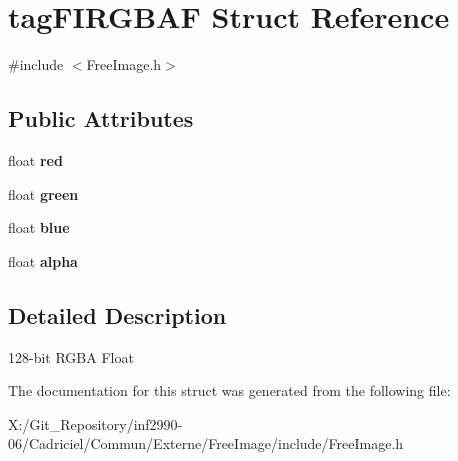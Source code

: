 \hypertarget{structtag_f_i_r_g_b_a_f}{\section{tag\-F\-I\-R\-G\-B\-A\-F Struct Reference}
\label{structtag_f_i_r_g_b_a_f}
}


{\ttfamily \#include $<$Free\-Image.\-h$>$}

\subsection*{Public Attributes}
\begin{DoxyCompactItemize}
\item 
\hypertarget{structtag_f_i_r_g_b_a_f_a59e5260e2f6e013661bc5d4775b18d9e}{float {\bfseries red}}\label{structtag_f_i_r_g_b_a_f_a59e5260e2f6e013661bc5d4775b18d9e}

\item 
\hypertarget{structtag_f_i_r_g_b_a_f_ac4e284e0711fdba31b624cee92d85e2b}{float {\bfseries green}}\label{structtag_f_i_r_g_b_a_f_ac4e284e0711fdba31b624cee92d85e2b}

\item 
\hypertarget{structtag_f_i_r_g_b_a_f_a9c2e5ec45c4c33518fd4765f5fd04b01}{float {\bfseries blue}}\label{structtag_f_i_r_g_b_a_f_a9c2e5ec45c4c33518fd4765f5fd04b01}

\item 
\hypertarget{structtag_f_i_r_g_b_a_f_a59da6fdc089e6ad1f8b2be601815f5cb}{float {\bfseries alpha}}\label{structtag_f_i_r_g_b_a_f_a59da6fdc089e6ad1f8b2be601815f5cb}

\end{DoxyCompactItemize}


\subsection{Detailed Description}
128-\/bit R\-G\-B\-A Float 

The documentation for this struct was generated from the following file\-:\begin{DoxyCompactItemize}
\item 
X\-:/\-Git\-\_\-\-Repository/inf2990-\/06/\-Cadriciel/\-Commun/\-Externe/\-Free\-Image/include/Free\-Image.\-h\end{DoxyCompactItemize}
